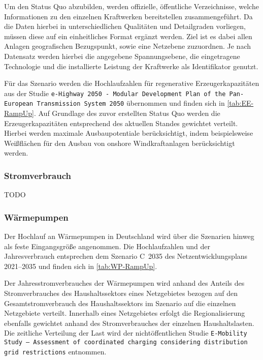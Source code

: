 Um den Status Quo abzubilden, werden offizielle, öffentliche Verzeichnisse, welche Informationen zu den einzelnen Kraftwerken bereitstellen zusammengeführt.
Da die Daten hierbei in unterschiedlichen Qualitäten und Detailgraden vorliegen, müssen diese auf ein einheitliches Format ergänzt werden.
Ziel ist es dabei allen Anlagen geografischen Bezugspunkt, sowie eine Netzebene zuzuordnen.
Je nach Datensatz werden hierbei die angegebene Spannungsebene, die eingetragene Technologie und die installierte Leistung der Kraftwerke als Identifikator genutzt.\medskip

Für das Szenario \ego werden die Hochlaufzahlen für regenerative Erzeugerkapazitäten aus der Studie \texttt{e-Highway 2050 - Modular Development Plan of the Pan-European Transmission System 2050} \cite{EEHPG2015} übernommen und finden sich in \autoref{tab:EE-RampUp}.
Auf Grundlage des zuvor erstellten Status Quo werden die Erzeugerkapazitäten entsprechend des aktuellen Standes gewichtet verteilt.
Hierbei werden maximale Ausbaupotentiale berücksichtigt, indem beispielsweise Weißflächen für den Ausbau von onshore Windkraftanlagen berücksichtigt werden.





\subsubsection{Stromverbrauch}

{\color{red} TODO}


\subsubsection{Wärmepumpen}

Der Hochlauf an Wärmepumpen in Deutschland wird über die Szenarien hinweg als feste Eingangsgröße angenommen.
Die Hochlaufzahlen und der Jahresverbrauch entsprechen dem Szenario C~\num{2035} des Netzentwicklungsplans \numrange[range-phrase=~{--}~]{2021}{2035} \cite{BNetzA2020} und finden sich in \autoref{tab:WP-RampUp}.



Der Jahresstromverbrauches der Wärmepumpen wird anhand des Anteils des Stromverbrauches des Haushaltssektors eines Netzgebietes bezogen auf den Gesamtstromverbrauch des Haushaltssektors im Szenario \ego auf die einzelnen Netzgebiete verteilt.
Innerhalb eines Netzgebietes erfolgt die Regionalisierung ebenfalls gewichtet anhand des Stromverbrauches der einzelnen Haushaltslasten.
Die zeitliche Verteilung der Last wird der nichtöffentlichen Studie \texttt{E-Mobility Study {--} Assessment of coordinated charging considering distribution grid restrictions} \cite{Schachler} entnommen.


